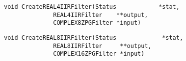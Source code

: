 \vspace{-0.1in}
\begin{verbatim}
void CreateREAL4IIRFilter(Status            *stat,
			  REAL4IIRFilter    **output,
			  COMPLEX8ZPGFilter *input)
\end{verbatim}
\vspace{-0.1in}
\begin{verbatim}
void CreateREAL8IIRFilter(Status             *stat,
			  REAL8IIRFilter     **output,
			  COMPLEX16ZPGFilter *input)
\end{verbatim}
